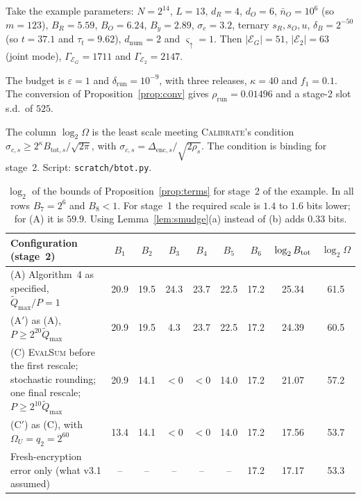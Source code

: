 Take the example parameters: $N=2^{14}$, $L=13$, $d_R=4$, $d_O=6$, $\bar n_O=10^6$ (so $m=123$), $B_R=5.59$, $B_O=6.24$, $B_y=2.89$, $\sigma_e=3.2$, ternary $s_R,s_O,u$, $\delta_B=2^{-50}$ (so $t=37.1$ and $\tau_t=9.62$), $d_{\mathrm{num}}=2$ and $\varsigma_\uparrow=1$. Then $|\mathcal E_G|=51$, $|\mathcal E_2|=63$ (joint mode), $\Gamma_{\mathcal E_G}=1711$ and $\Gamma_{\mathcal E_2}=2147$.

The budget is $\varepsilon=1$ and $\delta_{\mathrm{run}}=10^{-9}$, with three releases, $\kappa=40$ and $f_1=0.1$. The conversion of Proposition~\ref{prop:conv} gives $\rho_{\mathrm{run}}=0.01496$ and a stage-2 slot s.d.\ of $525$.

The column $\log_2\Omega$ is the least scale meeting \textsc{Calibrate}'s condition $\sigma_{c,s}\ge2^{\kappa}B_{\mathrm{tot},s}/\sqrt{2\pi}$, with $\sigma_{c,s}=\Delta_{\mathrm{enc},s}/\sqrt{2\rho_s}$. The condition is binding for stage~2. Script: \texttt{scratch/btot.py}.

\begin{table}[h]
\centering\small
\begin{tabularx}{\textwidth}{@{}>{\raggedright\arraybackslash}X cccccc cc@{}}
\toprule
Configuration (stage~2) & $B_1$ & $B_2$ & $B_3$ & $B_4$ & $B_5$ & $B_6$ & $\log_2B_{\mathrm{tot}}$ & $\log_2\Omega$ \\
\midrule
(A) Algorithm~4 as specified, $\tilde Q_{\max}/P=1$ & 20.9 & 19.5 & 24.3 & 23.7 & 22.5 & 17.2 & 25.34 & 61.5 \\
(A$'$) as (A), $P\ge2^{20}\tilde Q_{\max}$ & 20.9 & 19.5 & 4.3 & 23.7 & 22.5 & 17.2 & 24.39 & 60.5 \\
(C) \textsc{EvalSum} before the first rescale; stochastic rounding; one final rescale; $P\ge2^{10}\tilde Q_{\max}$ & 20.9 & 14.1 & $<0$ & $<0$ & 14.0 & 17.2 & 21.07 & 57.2 \\
(C$'$) as (C), with $\Omega_U=q_2=2^{60}$ & 13.4 & 14.1 & $<0$ & $<0$ & 14.0 & 17.2 & 17.56 & 53.7 \\
Fresh-encryption error only (what v3.1 assumed) & -- & -- & -- & -- & -- & 17.2 & 17.17 & 53.3 \\
\bottomrule
\end{tabularx}
\caption{$\log_2$ of the bounds of Proposition~\ref{prop:terms} for stage~2 of the example. In all rows $B_7=2^{6}$ and $B_8<1$. For stage~1 the required scale is $1.4$ to $1.6$ bits lower; for (A) it is $59.9$. Using Lemma~\ref{lem:smudge}(a) instead of (b) adds $0.33$ bits.}
\label{tab:btot}
\end{table}

